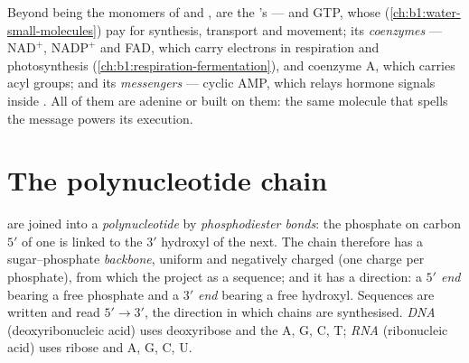\begin{proposition}\label{prop:b1:nucleic-acids:threejobs}
Beyond being the monomers of  and ,  are the 's
\emph{} ---  and GTP, whose 
(\cref{ch:b1:water-small-molecules}) pay for synthesis, transport and
movement; its \emph{coenzymes} --- $\mathrm{NAD^+}$, $\mathrm{NADP^+}$
and FAD, which carry electrons in respiration and photosynthesis
(\cref{ch:b1:respiration-fermentation}), and coenzyme A, which carries
acyl groups; and its \emph{messengers} --- cyclic AMP, which relays
hormone signals inside . All of them are adenine  or
built on them: the same molecule that spells the message powers its
execution.
\end{proposition}

\section{The polynucleotide chain}

\begin{definition}\label{def:b1:nucleic-acids:chain}
 are joined into a \emph{polynucleotide}
by \emph{phosphodiester bonds}: the
phosphate on carbon $5'$ of one  is linked to the $3'$
hydroxyl of the next. The chain therefore has a sugar--phosphate
\emph{backbone}, uniform and negatively charged (one charge per
phosphate), from which the  project as a sequence; and it has a
direction: a \emph{$5'$ end} bearing a free
phosphate and a \emph{$3'$ end} bearing a free
hydroxyl. Sequences are written and read $5' \to 3'$, the direction in
which chains are synthesised. \emph{DNA} (deoxyribonucleic
acid) uses deoxyribose and the  A, G, C, T; \emph{RNA}
(ribonucleic acid) uses ribose and A, G, C, U.
\end{definition}

